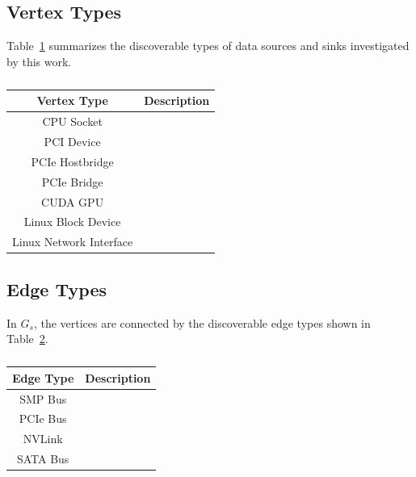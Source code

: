 \subsection{Vertex Types}
\label{sec:system-vertices}

Table~\ref{tab:topology-vertices} summarizes the discoverable types of data sources and sinks investigated by this work.


\begin{table}[]
    \centering
    \caption[Discoverable vertex types]{}
    \label{tab:topology-vertices}
    \begin{tabular}{|c|c|}
    \hline
    \textbf{Vertex Type}    & \textbf{Description} \\ \hline
    CPU Socket              &                      \\ \hline
    PCI Device              &                      \\ \hline
    PCIe Hostbridge         &                      \\ \hline
    PCIe Bridge             &                      \\ \hline
    CUDA GPU                &                      \\ \hline
    Linux Block Device      &                      \\ \hline
    Linux Network Interface &                      \\ \hline
    \end{tabular}
\end{table}

\subsection{Edge Types}
\label{sec:system-edges}

In $G_s$, the vertices are connected by the discoverable edge types shown in Table~\ref{tab:topology-edges}.

\begin{table}[]
    \centering
    \caption[Discoverable edge types]{}
    \label{tab:topology-edges}
    \begin{tabular}{|c|c|}
    \hline
    \textbf{Edge Type} & \textbf{Description} \\ \hline
    SMP Bus            &                      \\ \hline
    PCIe Bus           &                      \\ \hline
    NVLink             &                      \\ \hline
    SATA Bus           &                      \\ \hline
    \end{tabular}
\end{table}



